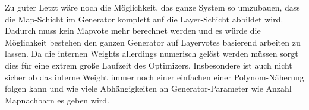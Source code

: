         Zu guter Letzt wäre noch die Möglichkeit, das ganze System so umzubauen, dass die Map-Schicht im Generator komplett auf die Layer-Schicht abbildet wird.
        Dadurch muss kein Mapvote mehr berechnet werden und es würde die Möglichkeit bestehen den ganzen Generator auf Layervotes basierend arbeiten zu lassen.
        Da die internen Weights allerdings numerisch gelöst werden müssen sorgt dies für eine extrem große Laufzeit des Optimizers.
        Insbesondere ist auch nicht sicher ob das interne Weight immer noch einer 
        einfachen einer Polynom-Näherung folgen kann und wie viele Abhängigkeiten an Generator-Parameter wie \glqq{}Anzahl Mapnachbarn\grqq{} es geben wird. 